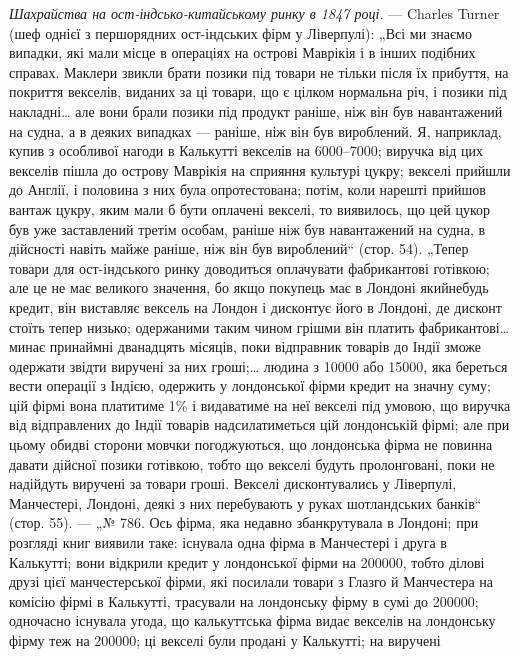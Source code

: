 \emph{Шахрайства на ост-індсько-китайському ринку в 1847 році.} — Charles
Turner (шеф однієї з першорядних ост-індських фірм у Ліверпулі): „Всі ми
знаємо випадки, які мали місце в операціях на острові Маврікія і в інших
подібних справах. Маклери звикли брати позики під товари не тільки після
їх прибуття, на покриття векселів, виданих за ці товари, що є цілком нормальна річ, і позики під
накладні\dots{} але вони брали позики під продукт раніше,
ніж він був навантажений на судна, а в деяких випадках — раніше, ніж він був
вироблений. Я, наприклад, купив з особливої нагоди в Калькутті векселів на 6000--7000; виручка від цих векселів пішла до острову Маврікія
на сприяння культурі цукру; векселі прийшли до Англії, і половина з них була
опротестована; потім, коли нарешті прийшов вантаж цукру, яким мали б бути
оплачені векселі, то виявилось, що цей цукор був уже заставлений третім особам,
раніше ніж був навантажений на судна, в дійсності навіть майже раніше, ніж він
був вироблений“ (стор. 54). „Тепер товари для ост-індського ринку доводиться
оплачувати фабрикантові готівкою; але це не має великого значення, бо якщо покупець має в Лондоні
якийнебудь кредит, він виставляє вексель на Лондон
і дисконтує його в Лондоні, де дисконт стоїть тепер низько; одержаними таким
чином грішми він платить фабрикантові\dots{} минає принаймні дванадцять місяців,
поки відправник товарів до Індії зможе одержати звідти виручені за них гроші;\dots{}
людина з \num{10000} або \num{15000}, яка береться вести операції з Індією, одержить у
лондонської фірми кредит на значну суму; цій фірмі вона платитиме 1\% і видаватиме на неї векселі під
умовою, що виручка від відправлених до
Індії товарів надсилатиметься цій лондонській фірмі; але при цьому обидві сторони мовчки
погоджуються, що лондонська фірма не повинна давати дійсної
позики готівкою, тобто що векселі будуть пролонговані, поки не надійдуть виручені за товари гроші.
Векселі дисконтувались у Ліверпулі, Манчестері, Лондоні, деякі з них перебувають у руках
шотландських банків“ (стор. 55). — „№ 786.
Ось фірма, яка недавно збанкрутувала в Лондоні; при розгляді книг виявили таке:
існувала одна фірма в Манчестері і друга в Калькутті; вони відкрили кредит
у лондонської фірми на \num{200000}, тобто ділові друзі цієї манчестерської фірми, які
посилали товари з Глазго й Манчестера на комісію фірмі в Калькутті, трасували на лондонську фірму в
сумі до \num{200000}; одночасно існувала угода, що калькуттська фірма видає векселів на
лондонську фірму теж на \num{200000}; ці векселі були продані у Калькутті; на виручені
